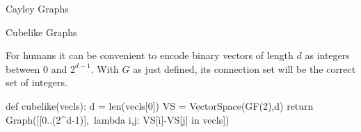 \begin{chap}{Cayley Graphs}
\begin{sect}{Cubelike Graphs}
\begin{para}
For humans it can be convenient to encode binary vectors of length $d$ as 
integers between 0 and $2^{d-1}$. With $G$ as just defined, its connection
set will be the correct set of integers.
\end{para}
%
\begin{sagecode}
\begin{sageinput}
def cubelike(vecls):
    d = len(vecls[0])
    VS = VectorSpace(GF(2),d)
    return Graph([[0..(2^d-1)],\
     lambda i,j: VS[i]-VS[j] in vecls])
\end{sageinput}
\end{sagecode}
%
\end{sect}
%
\end{chap}